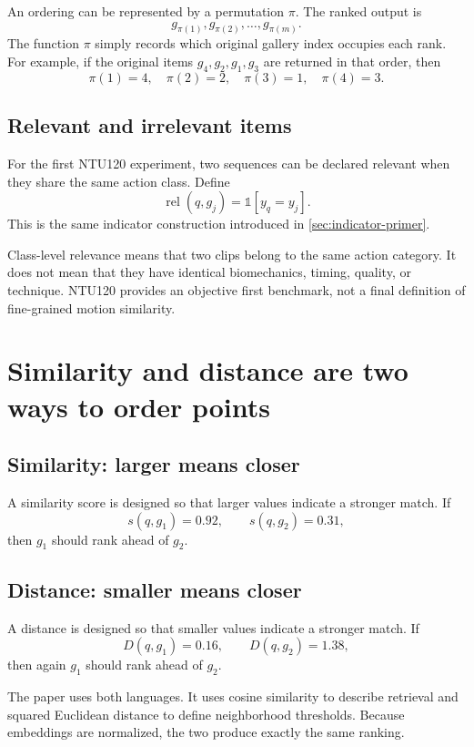 \documentclass[11pt,oneside,openany]{book}
\theoremstyle{myplain}
\theoremstyle{definition}
\newcommand{\ind}{\mathds{1}}
\begin{document}
An ordering can be represented by a permutation $\pi$. The ranked output is
\[
  g_{\pi(1)},g_{\pi(2)},\ldots,g_{\pi(m)}.
\]
The function $\pi$ simply records which original gallery index occupies each rank. For example, if the original items $g_4,g_2,g_1,g_3$ are returned in that order, then
\[
\pi(1)=4,\quad \pi(2)=2,\quad \pi(3)=1,\quad \pi(4)=3.
\]

\subsection{Relevant and irrelevant items}

For the first NTU120 experiment, two sequences can be declared relevant when they share the same action class. Define
\[
  \operatorname{rel}(q,g_j)=\ind[y_q=y_j].
\]
This is the same indicator construction introduced in \cref{sec:indicator-primer}.

\begin{conceptbox}[title=What this relevance definition does not claim]
Class-level relevance means that two clips belong to the same action category. It does not mean that they have identical biomechanics, timing, quality, or technique. NTU120 provides an objective first benchmark, not a final definition of fine-grained motion similarity.
\end{conceptbox}

\section{Similarity and distance are two ways to order points}

\subsection{Similarity: larger means closer}

A similarity score is designed so that larger values indicate a stronger match. If
\[
  s(q,g_1)=0.92,\qquad s(q,g_2)=0.31,
\]
then $g_1$ should rank ahead of $g_2$.

\subsection{Distance: smaller means closer}

A distance is designed so that smaller values indicate a stronger match. If
\[
  D(q,g_1)=0.16,\qquad D(q,g_2)=1.38,
\]
then again $g_1$ should rank ahead of $g_2$.

The paper uses both languages. It uses cosine similarity to describe retrieval and squared Euclidean distance to define neighborhood thresholds. Because embeddings are normalized, the two produce exactly the same ranking.
\end{document}
